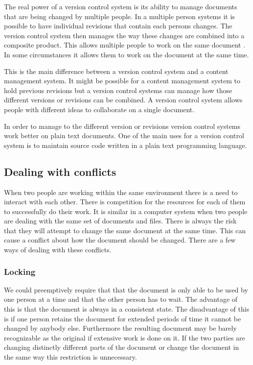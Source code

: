 The real power of a version control system is its ability to manage documents that are being changed by multiple people.  In a multiple person systems it is possible to have individual revisions that contain each persons changes. The version control system then manages the way these changes are combined into a composite product. This allows multiple people to work on the same document . In some circumstances it allows them to work on the document at the same time.

This is the main difference between a version control system and a content management system.  It might be possible for a content management system to hold previous revisions but  a version control systems can manage how those different versions or revisions can be combined.  A version control system allows people with different ideas to collaborate on a single document.

In order to manage to the different version or revisions version control systems work better on plain text documents. One of the main uses for a version control system is to maintain source code written in a plain text programming language.



\subsection{Dealing with conflicts}
When two people are working within the same environment there is a need to interact with each other.
There is competition for the resources for each of them to successfully do their work.
It is similar in a computer system when two people are dealing with the same set of documents and files.
There is always the risk that they will attempt to change the same document at the same time.
This can cause a conflict about how the document should be changed.
There are a few ways of dealing with these conflicts.

\subsubsection{Locking}
We could preemptively require that that the document is only able to be used by one person at a time and that the other person has to wait. The advantage of this is that the document is always in a consistent state. The disadvantage of this is if one person retains the document for extended periods of time it cannot be changed by anybody else. Furthermore the resulting document may be barely recognizable as the original if extensive work is done on it. If the two parties are changing distinctly different parts of the document or change the document in the same way this restriction is unnecessary.


